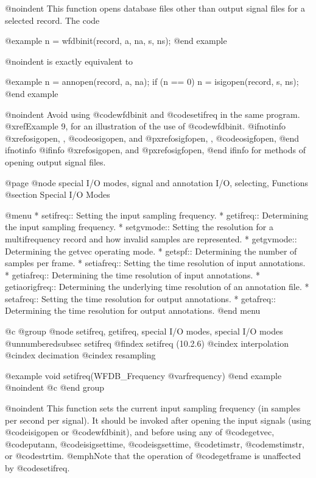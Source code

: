 {{{{{{{{@noindent
This function opens database files other than output signal
files for a selected record.  The code

@example
n = wfdbinit(record, a, na, s, ns);
@end example

@noindent
is exactly equivalent to

@example
n = annopen(record, a, na);
if (n == 0)
    n = isigopen(record, s, ns);
@end example

@noindent
Avoid using @code{wfdbinit} and @code{setifreq} in the same program.
@xref{Example 9}, for an illustration of the use of @code{wfdbinit}.
@ifnotinfo
@xref{osigopen, , @code{osigopen}}, and @pxref{osigfopen, , @code{osigfopen}},
@end ifnotinfo
@ifinfo
@xref{osigopen}, and @pxref{osigfopen},
@end ifinfo
for methods of opening output signal files.

@page
@node     special I/O modes, signal and annotation I/O, selecting, Functions
@section Special I/O Modes

@menu
* setifreq::			Setting the input sampling frequency.
* getifreq::                    Determining the input sampling frequency.
* setgvmode::                   Setting the resolution for a multifrequency
                                record and how invalid samples are represented.
* getgvmode::                   Determining the getvec operating mode.
* getspf::                      Determining the number of samples per frame.
* setiafreq::                   Setting the time resolution of input
                                annotations.
* getiafreq::                   Determining the time resolution of input
                                annotations.
* getiaorigfreq::               Determining the underlying time resolution
                                of an annotation file.
* setafreq::			Setting the time resolution for output
                                annotations.
* getafreq::                    Determining the time resolution for output
                                annotations.
@end menu

@c @group
@node     setifreq, getifreq, special I/O modes, special I/O modes
@unnumberedsubsec setifreq
@findex setifreq (10.2.6)
@cindex interpolation
@cindex decimation
@cindex resampling

@example
void setifreq(WFDB_Frequency @var{frequency})
@end example
@noindent
@c @end group

@noindent
This function sets the current input sampling frequency (in samples per
second per signal).  It should be invoked after opening the input
signals (using @code{isigopen} or @code{wfdbinit}), and before using any
of @code{getvec}, @code{putann}, @code{isigsettime}, @code{isgsettime},
@code{timstr}, @code{mstimstr}, or @code{strtim}.
@emph{Note that the operation of @code{getframe} is unaffected by
@code{setifreq}.}

}}}}}}}}
